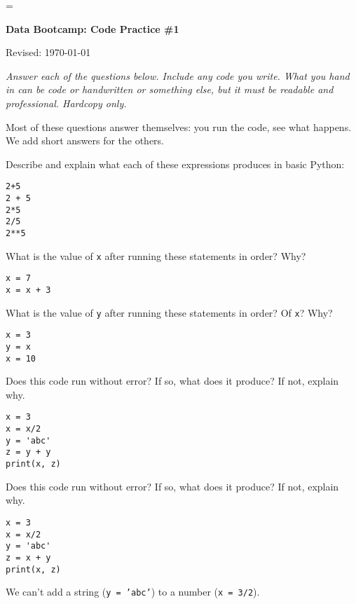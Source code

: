 \documentclass[11pt]{exam}
\begin{document}
\parskip=\bigskipamount
\parindent=0.0in
\thispagestyle{empty}


\bigskip\bigskip
\centerline{\Large \bf Data Bootcamp:  Code Practice \#1}
\centerline{Revised: \today}

\medskip
{\it Answer each of the questions below.
Include any code you write.
What you hand in can be code or handwritten or something else,
but it must be readable and professional.
Hardcopy only.}

\begin{solution}
Most of these questions answer themselves:  you run the code,
see what happens.  We add short answers for the others.
\end{solution}


\begin{questions}
\item Describe and explain what each of these expressions produces in basic Python:
\begin{verbatim}
2+5
2 + 5
2*5
2/5
2**5
\end{verbatim}

\item What is the value of \texttt{x} after running these statements in order? Why?
\begin{verbatim}
x = 7
x = x + 3
\end{verbatim}

\item What is the value of \texttt{y} after running these statements in order?
Of \texttt{x}?  Why?
\begin{verbatim}
x = 3
y = x
x = 10
\end{verbatim}

\item Does this code run without error?  If so, what does it produce?  If not, explain why.
\begin{verbatim}
x = 3
x = x/2
y = 'abc'
z = y + y
print(x, z)
\end{verbatim}

\item Does this code run without error?  If so, what does it produce?  If not, explain why.
\begin{verbatim}
x = 3
x = x/2
y = 'abc'
z = x + y
print(x, z)
\end{verbatim}

\begin{solution}
We can't add a string ({\tt y = 'abc'}) to a number ({\tt x = 3/2}).
\end{solution}


\end{questions}
\end{document}
